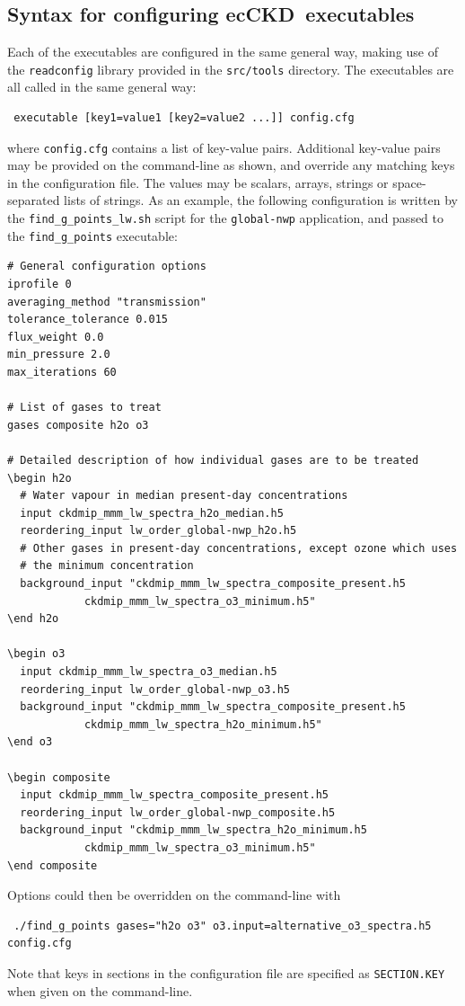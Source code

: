 \documentclass[a4,oneside]{article}
\def\codesize{\small}
\newcommand{\ecckd}{ecCKD}
\def\codesize{\small}
\def\code#1{{\codesize\texttt{#1}}}
\begin{document}
\subsection{Syntax for configuring \ecckd\ executables}
\label{sec:executables}
Each of the executables are configured in the same general way, making
use of the \code{readconfig} library provided in the \code{src/tools}
directory. The executables are all called in the same general way:
\begin{lstlisting}
 executable [key1=value1 [key2=value2 ...]] config.cfg
\end{lstlisting}
where \code{config.cfg} contains a list of key-value pairs. Additional
key-value pairs may be provided on the command-line as shown, and
override any matching keys in the configuration file. The values may
be scalars, arrays, strings or space-separated lists of strings. As an
example, the following configuration is written by the
\code{find\_g\_points\_lw.sh} script for the \code{global-nwp}
application, and passed to the \code{find\_g\_points} executable:
%
\begin{lstlisting}
# General configuration options
iprofile 0
averaging_method "transmission"
tolerance_tolerance 0.015
flux_weight 0.0
min_pressure 2.0
max_iterations 60

# List of gases to treat
gases composite h2o o3

# Detailed description of how individual gases are to be treated
\begin h2o
  # Water vapour in median present-day concentrations
  input ckdmip_mmm_lw_spectra_h2o_median.h5
  reordering_input lw_order_global-nwp_h2o.h5
  # Other gases in present-day concentrations, except ozone which uses
  # the minimum concentration
  background_input "ckdmip_mmm_lw_spectra_composite_present.h5
            ckdmip_mmm_lw_spectra_o3_minimum.h5"
\end h2o

\begin o3
  input ckdmip_mmm_lw_spectra_o3_median.h5
  reordering_input lw_order_global-nwp_o3.h5
  background_input "ckdmip_mmm_lw_spectra_composite_present.h5
            ckdmip_mmm_lw_spectra_h2o_minimum.h5"
\end o3

\begin composite
  input ckdmip_mmm_lw_spectra_composite_present.h5
  reordering_input lw_order_global-nwp_composite.h5
  background_input "ckdmip_mmm_lw_spectra_h2o_minimum.h5
            ckdmip_mmm_lw_spectra_o3_minimum.h5"
\end composite
\end{lstlisting}
Options could then be overridden on the command-line with
\begin{lstlisting}
 ./find_g_points gases="h2o o3" o3.input=alternative_o3_spectra.h5 config.cfg
\end{lstlisting}
Note that keys in sections in the configuration file are specified as
\code{SECTION.KEY} when given on the command-line.
\end{document}
